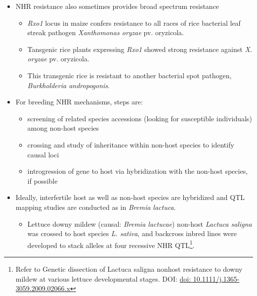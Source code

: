\documentclass[11pt,dvipsnames,ignorenonframetext,aspectratio=169]{beamer}
\providecommand{\tightlist}{%
  \setlength{\itemsep}{0pt}\setlength{\parskip}{0pt}}
\begin{document}
\begin{frame}{}
\protect\hypertarget{section-4}{}
\small

\begin{itemize}
\tightlist
\item
  NHR resistance also sometimes provides broad spectrum resistance

  \begin{itemize}
  \footnotesize
  \item \textit{Rxo1} locus in maize confers resistance to all races of rice bacterial leaf streak pathogen \textit{Xanthomonas oryzae} pv. {oryzicola}.
  \item Tansgenic rice plants expressing \textit{Rxo1} showed strong resistance against \textit{X. oryzae} pv. {oryzicola}.
  \item This transgenic rice is resistant to another bacterial spot pathogen, \textit{Burkholderia andropogonis}.
  \end{itemize}
\item
  For breeding NHR mechanisms, steps are:

  \begin{itemize}
  \footnotesize
  \item screening of related species accessions (looking for susceptible individuals) among non-host species
  \item crossing and study of inheritance within non-host species to identify causal loci
  \item introgression of gene to host via hybridization with the non-host species, if possible
  \end{itemize}
\end{itemize}

\footnotesize

\begin{itemize}
\tightlist
\item
  Ideally, interfertile host as well as non-host species are hybridized
  and QTL mapping studies are conducted as in \textit{Bremia lactuca}.

  \begin{itemize}
  \scriptsize
  \item Lettuce downy mildew (causal: \textit{Bremia lactucae}) non-host \textit{Lactuca saligna} was crossed to host species \textit{L. sativa}, and backcross inbred lines were developed to stack alleles at four recessive NHR QTL\footnote[frame]{Refer to Genetic dissection of Lactuca saligna nonhost resistance to downy mildew at various lettuce developmental stages. DOI: \url{doi: 10.1111/j.1365-3059.2009.02066.x}}.
  \end{itemize}
\end{itemize}
\end{frame}
\end{document}
